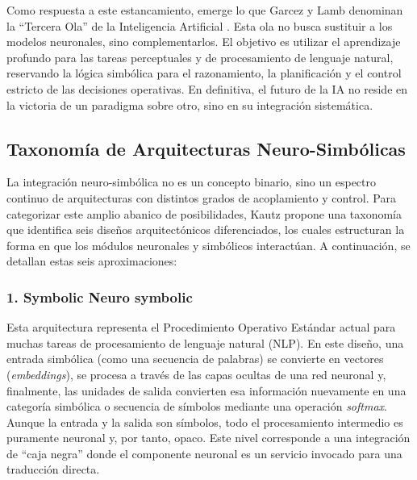 \documentclass[12pt,a4paper]{report}
\begin{document}
Como respuesta a este estancamiento, emerge lo que Garcez y Lamb denominan la ``Tercera Ola'' de la Inteligencia Artificial \cite{garcez2020thirdwave}. Esta ola no busca sustituir a los modelos neuronales, sino complementarlos. El objetivo es utilizar el aprendizaje profundo para las tareas perceptuales y de procesamiento de lenguaje natural, reservando la lógica simbólica para el razonamiento, la planificación y el control estricto de las decisiones operativas. En definitiva, el futuro de la IA no reside en la victoria de un paradigma sobre otro, sino en su integración sistemática.

\subsection{Taxonomía de Arquitecturas Neuro-Simbólicas}

La integración neuro-simbólica no es un concepto binario, sino un espectro continuo de arquitecturas con distintos grados de acoplamiento y control. Para categorizar este amplio abanico de posibilidades, Kautz \cite{kautz2022thirdsummer} propone una taxonomía que identifica seis diseños arquitectónicos diferenciados, los cuales estructuran la forma en que los módulos neuronales y simbólicos interactúan. A continuación, se detallan estas seis aproximaciones:

\subsubsection{1. Symbolic Neuro symbolic}
Esta arquitectura representa el Procedimiento Operativo Estándar actual para muchas tareas de procesamiento de lenguaje natural (NLP). En este diseño, una entrada simbólica (como una secuencia de palabras) se convierte en vectores (\textit{embeddings}), se procesa a través de las capas ocultas de una red neuronal y, finalmente, las unidades de salida convierten esa información nuevamente en una categoría simbólica o secuencia de símbolos mediante una operación \textit{softmax}. Aunque la entrada y la salida son símbolos, todo el procesamiento intermedio es puramente neuronal y, por tanto, opaco. Este nivel corresponde a una integración de ``caja negra'' donde el componente neuronal es un servicio invocado para una traducción directa.
\end{document}
